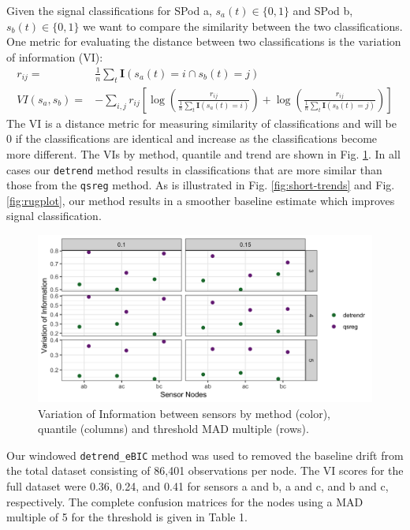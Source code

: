 \documentclass[12pt]{article}
\begin{document}
	Given the signal classifications for SPod a, $s_a(t) \in \{0,1\}$ and SPod b, $s_b(t)\in\{0,1\}$ we want to compare the similarity between the two classifications. One metric for evaluating the distance between two classifications is the variation of information (VI): 
	\begin{align*}
		r_{ij} =& \frac{1}{n}\sum_t \mathbf{I}(s_a(t) = i  \cap s_b(t) = j)\\
		VI(s_a, s_b) =& -\sum_{i,j} r_{ij} \left[ \log \left(\frac{r_{ij}}{\frac{1}{n}\sum_t \mathbf{I}(s_a(t) = i)}\right) + 
		\log \left(\frac{r_{ij}}{\frac{1}{n}\sum_t \mathbf{I}(s_b(t) = j)}\right) \right]
	\end{align*}	
	The VI is a distance metric for measuring similarity of classifications and will be 0 if the classifications are identical and increase as the classifications become more different. The VIs by method, quantile and trend are shown in Fig. \ref{fig:vi}. In all cases our \texttt{detrend} method results in classifications that are more similar than those from the \texttt{qsreg} method. As is illustrated in Fig. \ref{fig:short-trends} and Fig. \ref{fig:rugplot}, our method results in a smoother baseline estimate which improves signal classification. 
		
	\begin{figure}
		\centering
		\includegraphics[width = .9\linewidth]{Figures/VI_app_short.png}
		\caption{Variation of Information between sensors by method (color), quantile (columns) and threshold MAD multiple (rows).}
		\label{fig:vi}
	\end{figure}
	
	Our windowed \texttt{detrend\_eBIC} method was used to removed the baseline drift from the total dataset consisting of 86,401 observations per node. The VI scores for the full dataset were 0.36, 0.24, and 0.41 for sensors a and b, a and c, and b and c, respectively. The complete confusion matrices for the nodes using a MAD multiple of 5 for the threshold is given in Table 1. 
		
\end{document}
